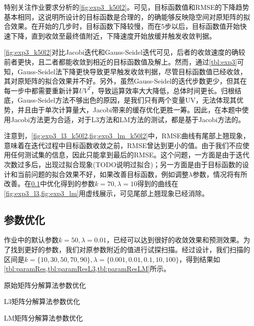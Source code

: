 \documentclass[a4paper,12pt]{article}
\begin{document}
    特别关注作业要求分析的\cref{fig:exp3_k50l2}。可见，目标函数值和RMSE的下降趋势基本相同，这说明所设计的目标函数是合理的，的确能够反映隐空间对原矩阵的拟合效果。在开始的几步时，目标函数下降较慢，而在5步以后，目标函数值开始快速下降，直到收敛至最终值附近，下降速度开始放缓并触发收敛判据。

    \cref{fig:exp3_k50l2}对比Jacobi迭代和Gauss-Seidel迭代可见，后者的收敛速度的确较前者更快，且二者都能收敛到相近的目标函数值及解上。然而，通过\cref{tbl:exp3}可知，Gauss-Seidel法下降更快导致更早触发收敛判据，尽管目标函数值已经收敛，其对原矩阵的拟合效果并不好。另外，虽然Gauss-Seidel的迭代步数更少，但其在每一步中都需要重新计算$UV^T$，导致运算效率大大降低，总体时间更长。归根结底，Gauss-Seidel方法不够出色的原因，是我们只有两个变量UV，无法体现其优势，并且由于单次计算量大，Jacobi带来的缓存优化更胜一筹。因此，在本题中使用Jacobi方法更为合适，对于L3方法和LM方法的测试，都是基于Jacobi方法的。

    注意到，\cref{fig:exp3_l3_k50l2,fig:exp3_lm_k50l2}中，RMSE曲线有尾部上翘现象，意味着在迭代过程中目标函数收敛之前，RMSE曾达到更小的值。由于我们不应使用任何测试集的信息，因此只能拿到最后的RMSE。这个问题，一方面是由于迭代次数过多后，出现过拟合现象(TODO说明过拟合)；另一方面是由于目标函数的设计和当前问题的拟合效果不好，如果改善目标函数，例如调整$\lambda$参数，情况将有所改善。在\cref{sub:param}中优化得到的参数$k=70,\lambda=10$得到的曲线在\cref{fig:exp3_l3,fig:exp3_lm}用虚线展示，可见尾部上翘现象已经消除。

    \subsection{参数优化}
    \label{sub:param}
    作业中的默认参数$k=50,\lambda=0.01$，已经可以达到很好的收敛效果和预测效果。为了找到更好的参数，我们对原参数附近的值进行试探扫描。经过设计，我们扫描的区间是$k=\{10,30,50,70,90\},\lambda=\{0.001,0.01,0.1,10,100\}$，得到结果如\cref{tbl:paramRes,tbl:paramResL3,tbl:paramResLM}所示。

    \begin{table}[htbp]
      \centering
      \caption{原始矩阵分解算法参数优化}
      \label{tbl:paramRes}
      
    \end{table}
    \begin{table}[htbp]
      \centering
      \caption{L3矩阵分解算法参数优化}
      \label{tbl:paramResL3}
      
    \end{table}
    \begin{table}[htbp]
      \centering
      \caption{LM矩阵分解算法参数优化}
      \label{tbl:paramResLM}
      
    \end{table}
\end{document}
